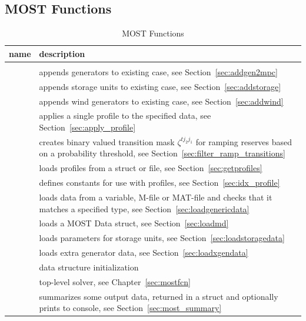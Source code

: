 \documentclass[12pt]{article}
\newcommand{\most}[0]{{MOST}}
\newcommand{\md}[0]{{\most{} Data struct}}
\newcommand{\code}[1]{{\relsize{-0.5}{\tt{{#1}}}}}  %
\numberwithin{equation}{section}
\numberwithin{table}{section}
\numberwithin{figure}{section}
\begin{document}
\begin{appendices}
\clearpage
\subsection{\most{} Functions}

\begin{table}[!ht]
\centering
\begin{threeparttable}
\caption{\most{} Functions}
\label{tab:mostsw}
\footnotesize
\begin{tabular}{lp{}}
\toprule
name & description \\
\midrule
\code{lib/}	& 	\\
\code{~~addgen2mpc}	& appends generators to existing case, see Section~\ref{sec:addgen2mpc}	\\
\code{~~addstorage}	& appends storage units to existing case, see Section~\ref{sec:addstorage}	\\
\code{~~addwind}	& appends wind generators to existing case, see Section~\ref{sec:addwind}	\\
\code{~~apply\_profile}	& applies a single profile to the specified data, see Section~\ref{sec:apply_profile}	\\
\code{~~filter\_ramp\_transitions}	& creates binary valued transition mask $\zeta^{tj_2j_1}$ for ramping reserves based on a probability threshold, see Section~\ref{sec:filter_ramp_transitions}	\\
\code{~~getprofiles}	& loads profiles from a struct or file, see Section~\ref{sec:getprofiles}	\\
\code{~~idx\_profile}	& defines constants for use with profiles, see Section~\ref{sec:idx_profile}	\\
\code{~~loadgenericdata}	& loads data from a variable, M-file or MAT-file and checks that it matches a specified type, see Section~\ref{sec:loadgenericdata}	\\
\code{~~loadmd}	& loads a \md{}, see Section~\ref{sec:loadmd}	\\
\code{~~loadstoragedata}	& loads parameters for storage units, see Section~\ref{sec:loadstoragedata}	\\
\code{~~loadxgendata}	& loads extra generator data, see Section~\ref{sec:loadxgendata}	\\
\code{~~md\_init}	& data structure initialization	\\
\code{~~most}	& top-level solver, see Chapter~\ref{sec:mostfcn}	\\
\code{~~most\_summary}	& summarizes some output data, returned in a struct and optionally prints to console, see Section~\ref{sec:most_summary}	\\

\end{tabular}
\end{threeparttable}
\end{table}
\end{appendices}
\end{document}
